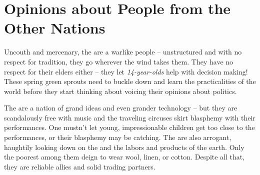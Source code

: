 \documentclass[blue]{GL2020}
\begin{document}
\section*{Opinions about People from the Other Nations}
Uncouth and mercenary, the \pShippies{} are a warlike people -- unstructured and with no respect for tradition, they go wherever the wind takes them.  They have no respect for their elders either -- they let \emph{14-year-olds} help with decision making!  These spring green sprouts need to buckle down and learn the practicalities of the world before they start thinking about voicing their opinions about politics.

The \pTech{} are a nation of grand ideas and even grander technology – but they are scandalously free with music and the traveling circuses skirt blasphemy with their performances.  One mustn’t let young, impressionable children get too close to the performances, or their blasphemy may be catching.  The \pTech{} are also arrogant, haughtily looking down on the \pFarm{} and the labors and products of the earth.  Only the poorest among them deign to wear wool, linen, or cotton.  Despite all that, they are reliable allies and solid trading partners.  
\end{document}
